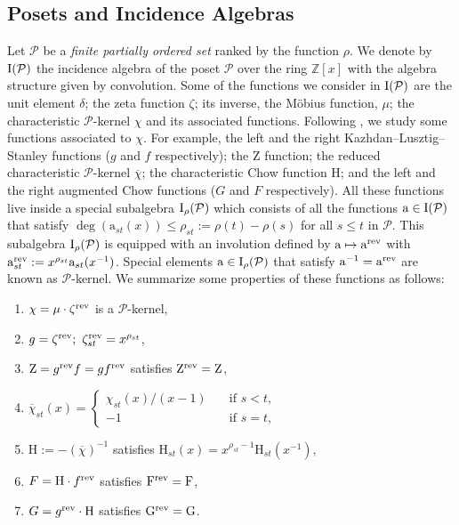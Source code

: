 \documentclass[12pt,letterpaper,english]{amsart}
\theoremstyle{teoremas}
\theoremstyle{definition}
\renewcommand{\H}{\mathrm{H}}
\newcommand{\calP}{\mathcal{P}}
\newcommand{\rev}{\normalfont\text{rev}}
\newcommand{\ZZ}{\mathbb{Z}}
\newcommand{\inc}{\normalfont\text{I}}
\newcommand{\barchi}{\overline{\chi}}
\begin{document}
\subsection{Posets and Incidence Algebras}
Let \(\calP\) be a \emph{finite partially ordered set} ranked by the function \(\rho\).
We denote by \(\inc(\calP)\) the incidence algebra of the poset \(\calP\) over the ring
\(\ZZ[x]\) with the algebra structure given by convolution.
Some of the functions we consider in \(\inc(\calP)\) are the unit element \(\delta\);
the zeta function \(\zeta\); its
inverse, the M\"obius function, \(\mu\);
the characteristic \(\calP\)-kernel \(\chi\) and its associated functions.
Following \cite{ferroni-matherne-vecchi}, we study some functions associated to
\(\chi\). For example, the left and the right Kazhdan--Lusztig--Stanley functions
(\(g\) and \(f\) respectively); the \(\mathrm{Z}\) function;
the reduced characteristic \(\calP\)-kernel  \(\overline{\chi}\);
the characteristic Chow function \(\H\); and the left and the right
augmented Chow functions (\(G\) and \(F\) respectively). All these
functions live inside a special subalgebra \(\inc_{\rho}(\calP)\)
which consists of all the functions \(\mathrm{a}\in\inc(\calP)\)
that satisfy \(\deg(\mathrm{a}_{st}(x))\leq\rho_{st}:=\rho(t)-\rho(s)\)
for all \(s\leq t\) in \(\calP\).
This subalgebra \(\inc_\rho(\calP)\) is equipped with an involution
defined by \(\mathrm{a}\mapsto\mathrm{a}^{\rev}\) with
\(\mathrm{a}^{\rev}_{st}:= x^{\rho_{st}}\mathrm{a}_{st}(x^{-1})\).
Special elements \(\mathrm{a}\in\inc_\rho(\calP)\) that satisfy
\(\mathrm{a}^{-1} = \mathrm{a}^{\rev}\) are known as \(\calP\)-kernel.
We summarize some properties of these functions as follows:
\begin{enumerate}
    \item \(\chi = \mu\cdot\zeta^{\rev}\) is a \(\calP\)-kernel,
    \item \(g = \zeta^{\rev};\ \zeta^{\rev}_{st} = x^{\rho_{st}}\),
    \item \(\mathrm{Z} = g^{\rev}f = gf^{\rev}\) satisfies \(\mathrm{Z}^{\rev}
          = \mathrm{Z}\),
    \item \(\displaystyle\barchi_{st}(x) =
          \begin{cases}
              \chi_{st}(x)/(x-1)\quad & \text{if } s<t,   \\
              -1 \quad                & \text{if } s = t,
          \end{cases}\)
    \item \(\H:=-\left(\barchi\right)^{-1}\) satisfies \(\H_{st}(x) = x^{\rho_{st}-1}\H_{st}(x^{-1}),\)
    \item \(F = \H\cdot f^{\rev}\) satisfies \(\mathrm{F}^{\rev}= \mathrm{F}\),
    \item \(G = g^{\rev}\cdot \H\) satisfies \(\mathrm{G}^{\rev}= \mathrm{G}\).
\end{enumerate}
\end{document}
